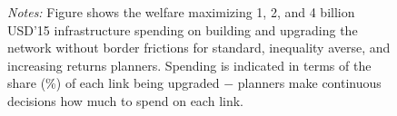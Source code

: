 \documentclass[a4paper]{article}
\begin{document}
\begin{figure}[H]
{\begin{tabular}{@{}c@{}c@{}c@{}}
\end{tabular}
}
\raggedright
\scriptsize 
\emph{Notes:} Figure shows the welfare maximizing 1, 2, and 4 billion USD'15 infrastructure spending on building and upgrading the network without border frictions for standard, inequality averse, and increasing returns planners. Spending is indicated in terms of the share (\%) of each link being upgraded $-$ planners make continuous decisions how much to spend on each link.  
\vspace{-1mm}
\end{figure}
\end{document}
